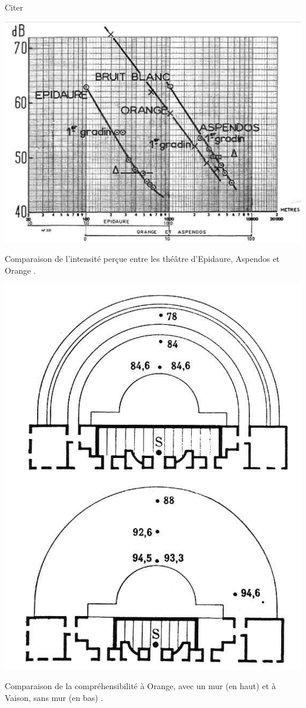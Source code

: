 Citer  \cite[p.25]{rindel}

\begin{figureth}
	\includegraphics[width=0.7\linewidth]{images/canac_comparaison}
	\caption[Comparaison de l'intensité perçue entre les théâtre d'Epidaure, Aspendos et Orange.]{Comparaison de l'intensité perçue entre les théâtre d'Epidaure, Aspendos et Orange \footnotemark.}
	\label{canac_comparaison}
\end{figureth}
%
\begin{figureth}
	\includegraphics[width=0.7\linewidth]{images/canac_comparaison2}
	\caption[Comparaison de la compréhensibilité à Orange, avec un mur (en haut) et à Vaison, sans mur (en bas).]{Comparaison de la compréhensibilité à Orange, avec un mur (en haut) et à Vaison, sans mur (en bas) \footnotemark.}
	\label{canac_comparaison2}
\end{figureth}

